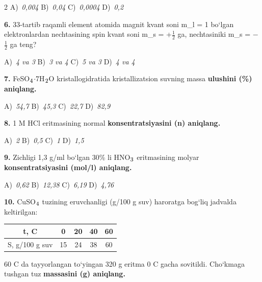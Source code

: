 \documentclass[11pt,a4paper]{article}
\renewcommand{\textsubscript}[1]{\ensuremath{_{\text{\fontsize{8}{8}\selectfont #1}}}}
\begin{document}
\begin{multicols}{2}
\noindent A)~\textsl{0,004} \hfill B)~\textsl{0,04} \hfill C)~\textsl{0,0004} \hfill D)~\textsl{0,2}\par
\vspace{4pt}
\noindent\textbf{6.} 33-tartib raqamli element atomida magnit kvant soni m\_l = 1 bo`lgan elektronlardan nechtasining spin kvant soni m\_s = +$\frac{1}{2}$ ga, nechtasiniki m\_s = $-$$\frac{1}{2}$ ga teng?

\noindent A)~\textsl{4 va 3} \hfill B)~\textsl{3 va 4} \hfill C)~\textsl{5 va 3} \hfill D)~\textsl{4 va 4}\par
\vspace{4pt}
\noindent\textbf{7.} FeSO\textsubscript{4}$\cdot$7H\textsubscript{2}O kristallogidratida kristallizatsion suvning massa \textbf{ulushini (\%) aniqlang.}

\noindent A)~\textsl{54,7} \hfill B)~\textsl{45,3} \hfill C)~\textsl{22,7} \hfill D)~\textsl{82,9}\par
\vspace{4pt}
\noindent\textbf{8.} 1 M HCl eritmasining normal \textbf{konsentratsiyasini (n) aniqlang.}

\noindent A)~\textsl{2} \hfill B)~\textsl{0,5} \hfill C)~\textsl{1} \hfill D)~\textsl{1,5}\par
\vspace{4pt}
\noindent\textbf{9.} Zichligi 1,3 g/ml bo`lgan 30\% li HNO\textsubscript{3} eritmasining molyar \textbf{konsentratsiyasini (mol/l) aniqlang.}

\noindent A)~\textsl{0,62} \hfill B)~\textsl{12,38} \hfill C)~\textsl{6,19} \hfill D)~\textsl{4,76}\par
\vspace{4pt}
\end{multicols}
\noindent\textbf{10.} CuSO\textsubscript{4} tuzining eruvchanligi (g/100 g suv) haroratga bog`liq jadvalda keltirilgan:
\begin{center}
\renewcommand{\arraystretch}{1.15}
\begin{tabular}{|c|c|c|c|c|}\hline
\textbf{t, \textdegree{}C} & \textbf{0} & \textbf{20} & \textbf{40} & \textbf{60} \\ \hline
S, g/100 g suv & 15 & 24 & 38 & 60 \\ \hline
\end{tabular}
\end{center}
60 \textdegree{}C da tayyorlangan to`yingan 320 g eritma 0 \textdegree{}C gacha sovitildi. Cho`kmaga tushgan tuz \textbf{massasini (g) aniqlang.}
\end{document}
